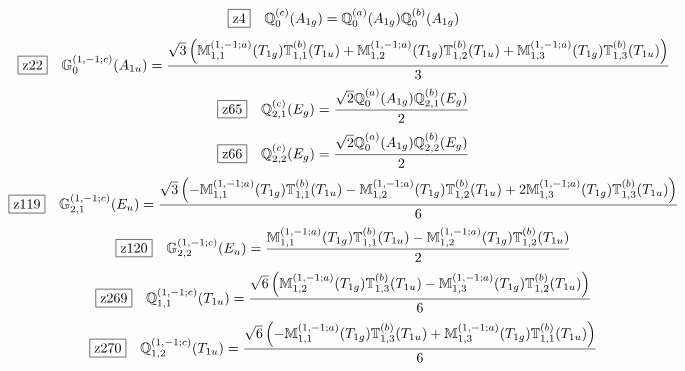 \documentclass[fleqn,10pt,landscape]{jsarticle}
\begin{document}
\begin{dmath*}
\hspace*{3mm}\fbox{z4}\quad \mathbb{Q}_{0}^{(c)}(A_{1g})=\mathbb{Q}_{0}^{(a)}(A_{1g}) \mathbb{Q}_{0}^{(b)}(A_{1g})
\end{dmath*}
\begin{dmath*}
\hspace*{3mm}\fbox{z22}\quad \mathbb{G}_{0}^{(1,-1;c)}(A_{1u})=\frac{\sqrt{3} \left(\mathbb{M}_{1,1}^{(1,-1;a)}(T_{1g}) \mathbb{T}_{1,1}^{(b)}(T_{1u}) + \mathbb{M}_{1,2}^{(1,-1;a)}(T_{1g}) \mathbb{T}_{1,2}^{(b)}(T_{1u}) + \mathbb{M}_{1,3}^{(1,-1;a)}(T_{1g}) \mathbb{T}_{1,3}^{(b)}(T_{1u})\right)}{3}
\end{dmath*}
\begin{dmath*}
\hspace*{3mm}\fbox{z65}\quad \mathbb{Q}_{2,1}^{(c)}(E_{g})=\frac{\sqrt{2} \mathbb{Q}_{0}^{(a)}(A_{1g}) \mathbb{Q}_{2,1}^{(b)}(E_{g})}{2}
\end{dmath*}
\begin{dmath*}
\hspace*{3mm}\fbox{z66}\quad \mathbb{Q}_{2,2}^{(c)}(E_{g})=\frac{\sqrt{2} \mathbb{Q}_{0}^{(a)}(A_{1g}) \mathbb{Q}_{2,2}^{(b)}(E_{g})}{2}
\end{dmath*}
\begin{dmath*}
\hspace*{3mm}\fbox{z119}\quad \mathbb{G}_{2,1}^{(1,-1;c)}(E_{u})=\frac{\sqrt{3} \left(- \mathbb{M}_{1,1}^{(1,-1;a)}(T_{1g}) \mathbb{T}_{1,1}^{(b)}(T_{1u}) - \mathbb{M}_{1,2}^{(1,-1;a)}(T_{1g}) \mathbb{T}_{1,2}^{(b)}(T_{1u}) + 2 \mathbb{M}_{1,3}^{(1,-1;a)}(T_{1g}) \mathbb{T}_{1,3}^{(b)}(T_{1u})\right)}{6}
\end{dmath*}
\begin{dmath*}
\hspace*{3mm}\fbox{z120}\quad \mathbb{G}_{2,2}^{(1,-1;c)}(E_{u})=\frac{\mathbb{M}_{1,1}^{(1,-1;a)}(T_{1g}) \mathbb{T}_{1,1}^{(b)}(T_{1u}) - \mathbb{M}_{1,2}^{(1,-1;a)}(T_{1g}) \mathbb{T}_{1,2}^{(b)}(T_{1u})}{2}
\end{dmath*}
\begin{dmath*}
\hspace*{3mm}\fbox{z269}\quad \mathbb{Q}_{1,1}^{(1,-1;c)}(T_{1u})=\frac{\sqrt{6} \left(\mathbb{M}_{1,2}^{(1,-1;a)}(T_{1g}) \mathbb{T}_{1,3}^{(b)}(T_{1u}) - \mathbb{M}_{1,3}^{(1,-1;a)}(T_{1g}) \mathbb{T}_{1,2}^{(b)}(T_{1u})\right)}{6}
\end{dmath*}
\begin{dmath*}
\hspace*{3mm}\fbox{z270}\quad \mathbb{Q}_{1,2}^{(1,-1;c)}(T_{1u})=\frac{\sqrt{6} \left(- \mathbb{M}_{1,1}^{(1,-1;a)}(T_{1g}) \mathbb{T}_{1,3}^{(b)}(T_{1u}) + \mathbb{M}_{1,3}^{(1,-1;a)}(T_{1g}) \mathbb{T}_{1,1}^{(b)}(T_{1u})\right)}{6}
\end{dmath*}
\end{document}
